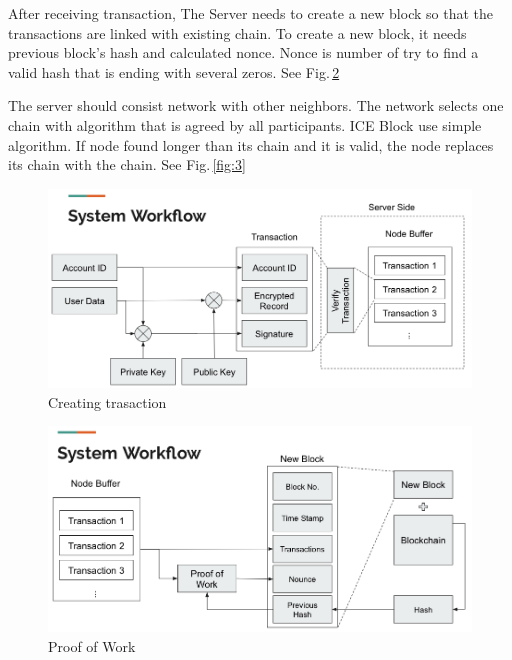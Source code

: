 \documentclass[conference]{IEEEtran}
\begin{document}
After receiving transaction, The Server needs to create a new block so that the transactions are linked with existing chain. To create a new block, it needs previous block’s hash and calculated nonce.
Nonce is number of try to find a valid hash that is ending with several zeros. See Fig.\,\ref{fig:2}

The server should consist network with other neighbors. The network selects one chain with algorithm that is agreed by all participants. ICE Block use simple algorithm.
If node found longer than its chain and it is valid, the node replaces its chain with the chain. See Fig.\,\ref{fig:3}
\begin{figure}
    \centering
    \includegraphics[scale=0.25]{encryption}
    \caption{Creating trasaction}
    \label{fig:1}
\end{figure}

\begin{figure}
    \centering
    \includegraphics[scale=0.25]{pow}
    \caption{Proof of Work}
    \label{fig:2}
\end{figure}
\end{document}
